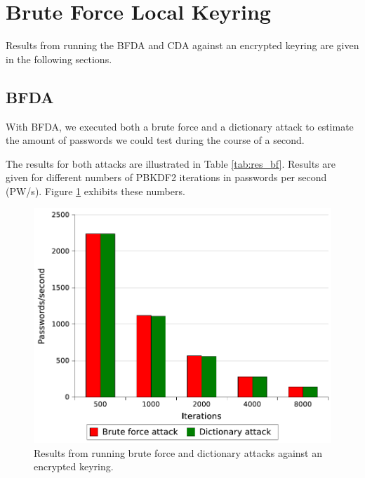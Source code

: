 \documentclass[pdftex,english,10pt,b5paper,twoside]{book}
\begin{document}
\section{Brute Force Local Keyring}
\label{sec:R:BFLK}
Results from running the BFDA and CDA against an encrypted keyring are
given in the following sections.

\subsection{\acl{BFDA}}

With \ac{BFDA}, we executed both a brute force and a dictionary attack to
estimate the amount of passwords we could test during the course of a second.


The results for both attacks are illustrated in Table \ref{tab:res_bf}. Results
are given for different numbers of \ac{PBKDF2} iterations in passwords per
second (PW/s). Figure \ref{fig:bfres} exhibits these numbers.



\begin{figure}[!h]
\centering
\includegraphics[scale=0.55]{graph_pbkdf2.pdf}
\caption{Results from running brute force and dictionary attacks against an encrypted keyring.}
\label{fig:bfres}
\end{figure}
\end{document}
